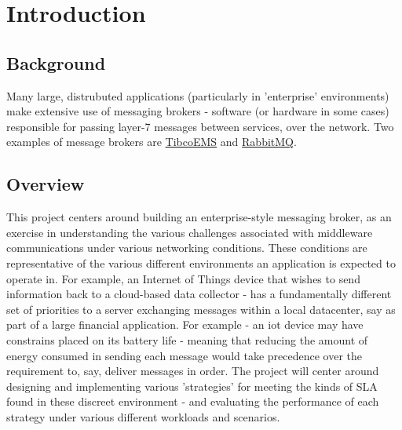 \section{Introduction}
\label{sec:Introduction}

\subsection{Background}
\label{sub:Background}

Many large, distrubuted applications (particularly in 'enterprise' environments)
make extensive use of messaging brokers -
software (or hardware in some cases\cite{solaceappliances}) responsible for passing
layer-7 messages between services, over the network. Two examples of message
brokers are
\href{http://www.tibco.com/products/automation/enterprise-messaging/enterprise-message-service}{TibcoEMS}
and \href{https://www.rabbitmq.com/}{RabbitMQ}.

\subsection{Overview}
\label{sub:Overview}

This project centers around building an enterprise-style messaging broker,
as an exercise in understanding the various challenges associated with middleware
communications under various networking conditions. These conditions are
representative of the various different environments an application is expected
to operate in. For example, an Internet of Things device that wishes to send information back
to a cloud-based data collector - has a fundamentally different set of priorities
to a server exchanging messages within a local datacenter, say as part of a large
financial application. For example - an \gls{iot} device may
have constrains placed on its battery life - meaning that reducing the amount of
energy consumed in sending each message would take precedence over the
requirement to, say, deliver messages in order. The project will center around
designing and implementing various 'strategies' for meeting the kinds of SLA
found in these discreet environment - and evaluating the performance of each
strategy under various different workloads and scenarios.
